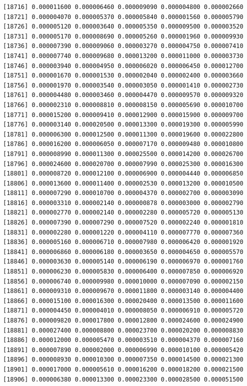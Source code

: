 \documentclass[]{article}
\begin{document}
\begin{verbatim}
[18716] 0.000011600 0.000006460 0.000009090 0.000004800 0.000002660
[18721] 0.000004070 0.000005370 0.000005840 0.000001560 0.000005790
[18726] 0.000005120 0.000003640 0.000005350 0.000009500 0.000003520
[18731] 0.000005170 0.000008690 0.000005260 0.000001960 0.000009930
[18736] 0.000007390 0.000009060 0.000003270 0.000004750 0.000007410
[18741] 0.000007740 0.000009680 0.000013200 0.000011000 0.000003730
[18746] 0.000003940 0.000004950 0.000006020 0.000006450 0.000012700
[18751] 0.000001670 0.000001530 0.000002040 0.000002400 0.000003660
[18756] 0.000001970 0.000003540 0.000003050 0.000001410 0.000002730
[18761] 0.000004480 0.000003460 0.000004470 0.000009570 0.000009320
[18766] 0.000002310 0.000008810 0.000008150 0.000005690 0.000010700
[18771] 0.000015200 0.000009410 0.000012900 0.000015900 0.000009700
[18776] 0.000003140 0.000020500 0.000013300 0.000019300 0.000005990
[18781] 0.000006300 0.000012500 0.000011300 0.000019600 0.000022800
[18786] 0.000016200 0.000006050 0.000007170 0.000009480 0.000010800
[18791] 0.000008990 0.000011300 0.000025500 0.000014200 0.000026700
[18796] 0.000024600 0.000020700 0.000007990 0.000025300 0.000016300
[18801] 0.000008720 0.000012100 0.000006900 0.000004440 0.000006850
[18806] 0.000013600 0.000011400 0.000002530 0.000013200 0.000010500
[18811] 0.000007290 0.000010700 0.000004370 0.000002700 0.000003090
[18816] 0.000003310 0.000002140 0.000000878 0.000003000 0.000002790
[18821] 0.000002770 0.000002140 0.000002280 0.000005720 0.000005130
[18826] 0.000007390 0.000007290 0.000007520 0.000002240 0.000001810
[18831] 0.000002280 0.000001220 0.000004110 0.000007770 0.000007360
[18836] 0.000005160 0.000006710 0.000007980 0.000006420 0.000001920
[18841] 0.000006860 0.000006180 0.000003650 0.000004650 0.000005570
[18846] 0.000003630 0.000005140 0.000006190 0.000006970 0.000001760
[18851] 0.000006230 0.000005830 0.000006400 0.000007850 0.000006920
[18856] 0.000006740 0.000009980 0.000010000 0.000007090 0.000002150
[18861] 0.000009310 0.000009670 0.000011800 0.000003140 0.000004400
[18866] 0.000015100 0.000016300 0.000020400 0.000013500 0.000011600
[18871] 0.000004450 0.000004010 0.000008050 0.000006910 0.000005720
[18876] 0.000009820 0.000017800 0.000012800 0.000024600 0.000024900
[18881] 0.000027400 0.000008800 0.000023700 0.000020200 0.000008830
[18886] 0.000012000 0.000005470 0.000003510 0.000004370 0.000007160
[18891] 0.000007890 0.000002000 0.000006990 0.000010100 0.000005420
[18896] 0.000008930 0.000010300 0.000007350 0.000014500 0.000021300
[18901] 0.000017000 0.000005610 0.000016200 0.000018200 0.000021500
[18906] 0.000006380 0.000013300 0.000023300 0.000028500 0.000051500

\end{verbatim}
\end{document}
